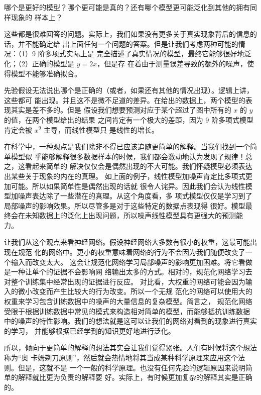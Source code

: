 哪个是更好的模型？哪个更可能是真的？还有哪个模型更可能泛化到其他的拥有同样现象的
样本上？

这些都是很难回答的问题。实际上，我们如果没有更多关于真实现象背后的信息的话，并不能确定给
出上面任何一个问题的答案。但是让我们考虑两种可能的情况：（1）9 阶多项式实际上是
完全描述了真实情况的模型，最终它能够很好地泛化；（2）正确的模型是 $y=2x$，但是存
在着由于测量误差导致的额外的噪声，使得模型不能够准确拟合。

先验假设无法说出哪个是正确的（或者，如果还有其他的情况出现）。逻辑上讲，这些都可
能出现。并且这不是微不足道的差异。在给出的数据上，两个模型的表现其实是差不多的。但是
假设我们想要预测对应于某个超过了图中所有的 $x$ 的 $y$ 的值，在两个模型给出的结果
之间肯定有一个极大的差距，因为 9 阶多项式模型肯定会被 $x^9$ 主导，而线性模型只
是线性的增长。

在科学中，一种观点是我们除非不得已应该追随更简单的解释。当我们找到一个简单模型似
乎能够解释很多数据样本的时候，我们都会激动地认为发现了规律！总之，这看起来简单的
解决仅仅会是偶然出现的不大可能。我们怀疑模型必须表达出某些关于现象的内在的真理。
如上面的例子，线性模型加噪声肯定比多项式更加可能。所以如果简单性是偶然出现的话就
很令人诧异。因此我们会认为线性模型加噪声表达除了一些潜在的真理。从这个角度看，多
项式模型仅仅是学习到了局部噪声的影响效果。所以尽管多是对于这些特定的数据点表现得
很好。模型最终会在未知数据上的泛化上出现问题，所以噪声线性模型具有更强大的预测能
力。

让我们从这个观点来看神经网络。假设神经网络大多数有很小的权重，这最可能出现在规范
化的网络中。更小的权重意味着网络的行为不会因为我们随便改变了一个输入而改变太大。
这会让规范化网络学习局部噪声的影响更加困难。将它看做是一种让单个的证据不会影响网
络输出太多的方式。相对的，规范化网络学习去对整个训练集中经常出现的证据进行反应。
对比看，大权重的网络可能会因为输入的微小改变而产生比较大的行为改变。所以一个无规
范化的网络可以使用大的权重来学习包含训练数据中的噪声的大量信息的复杂模型。简言之，
规范化网络受限于根据训练数据中常见的模式来构造相对简单的模型，而能够抵抗训练数据
中的噪声的特性影响。我们的想法就是这可以让我们的网络对看到的现象进行真实的学习，
并能够根据已经学到的知识更好地进行泛化。

所以，倾向于更简单的解释的想法其实会让我们觉得紧张。人们有时候将这个想法称为“奥
卡姆剃刀原则”，然后就会热情地将其当成某种科学原理来应用这个法则。但是，这就不是
一个一般的科学原理。也没有任何先验的逻辑原因来说明简单的解释就比更为负责的解释要
好。实际上，有时候更加复杂的解释其实是正确的。

